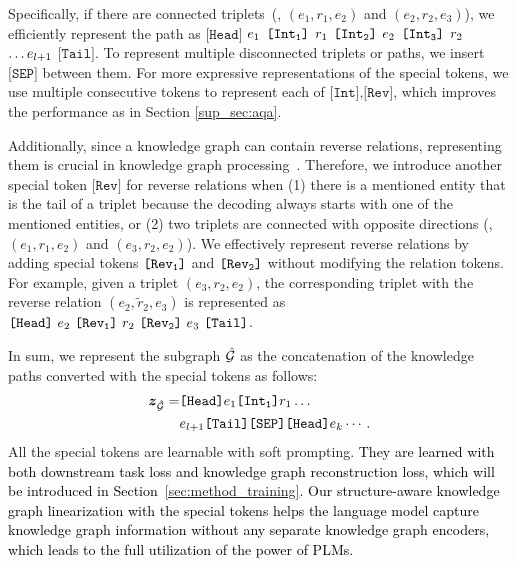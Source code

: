Specifically, if there are connected triplets~(\eg, $(e_1, r_1, e_2)$ and $(e_2, r_2, e_3)$), we efficiently represent the path as $\texttt{[Head]}$ $e_1$ $\texttt{[Int{\textsubscript{\texttt{1}}}]}$ $r_1$ $\texttt{[Int{\textsubscript{\texttt{2}}}]}$ $e_2$ $\texttt{[Int{\textsubscript{\texttt{3}}}]}$ $r_2$ $\dots e_{l+1}$ $\texttt{[Tail]}$.
To represent multiple disconnected triplets or paths, we insert $\texttt{[SEP]}$ between them.
For more expressive representations of the special tokens, we use multiple consecutive tokens to represent each of $\texttt{[Int],[Rev]}$, which improves the performance as in Section \ref{sup_sec:aqa}.

Additionally, since a knowledge graph can contain reverse relations, representing them is crucial in knowledge graph processing~\cite{feng2020scalable,qi2023investigation,zhu2024dyval}.
Therefore, we introduce another special token $\texttt{[Rev]}$ for reverse relations when (1) there is a mentioned entity that is the tail of a triplet because the decoding always starts with one of the mentioned entities, or (2) two triplets are connected with opposite directions (\eg, $(e_1, r_1, e_2)$ and $(e_3, r_2, e_2)$). 
We effectively represent reverse relations by adding special tokens $\texttt{[Rev{\textsubscript{\texttt{1}}}]}$ and $\texttt{[Rev{\textsubscript{\texttt{2}}}]}$ without modifying the relation tokens. For example, given a triplet $(e_3, r_2, e_2)$, the corresponding triplet with the reverse relation $(e_2, \tilde r_2, e_3)$ is represented as $\texttt{[Head]} \ \Ent_2 \ \texttt{[Rev{\textsubscript{\texttt{1}}}]} \ \Rel_2 \ \texttt{[Rev{\textsubscript{\texttt{2}}}]}  \ \Ent_{3} \ \texttt{[Tail]}$.

In sum, we represent the subgraph $\hat{\mathcal{G}}$ as the concatenation of the knowledge paths converted with the special tokens as follows:
\begin{equation}
\begin{split}
\boldsymbol{z}_{\hat{\mathcal{G}}} =  &\texttt{[Head]}e_1\texttt{[Int{\textsubscript{\texttt{1}}}]}r_1\dots \\ &e_{l+1}\texttt{[Tail]} \texttt{[SEP]}\texttt{[Head]}e_k\cdots.
\end{split}
\label{eq:kpg}
\end{equation}
All the special tokens are learnable with soft prompting.
\textcolor{black}{They are learned with both downstream task loss and knowledge graph reconstruction loss, which will be introduced in Section~\ref{sec:method_training}.
Our structure-aware knowledge graph linearization with the special tokens helps the language model capture knowledge graph information without any separate knowledge graph encoders, which leads to the full utilization of the power of PLMs.
}


